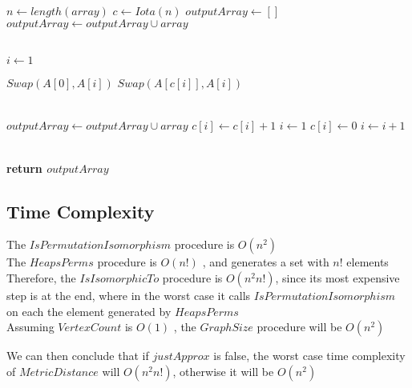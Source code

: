 \begin{algorithm}[h]
	\begin{algorithmic}[1]
		 
			\State $n \gets length(array)$
			\State $c \gets Iota(n)$ 
			\State $outputArray \gets []$
			\State $outputArray \gets outputArray \cup array$
			
			\\
			
			\State $i \gets 1$
			
						\State $Swap(A[0], A[i])$
					\Else
						\State $Swap(A[c[i]], A[i])$
					\EndIf
					
					\\
					
					\State $outputArray \gets outputArray \cup array$
					\State $c[i] \gets c[i] + 1$
					\State $i \gets 1$
				\Else
					\State $c[i] \gets 0$
					\State $i \gets i + 1$
				\EndIf
			\EndWhile
			
			\\
			
			\State \textbf{return $outputArray$}
		\EndProcedure		
	\end{algorithmic}
\end{algorithm}

\newpage

\subsection{Time Complexity}
The $IsPermutationIsomorphism$ procedure is $O(n^2)$ \\
The $HeapsPerms$ procedure is $O(n!)$ \cite{10.1093/comjnl/6.3.293}, and generates a set with $n!$ elements \\
Therefore, the $IsIsomorphicTo$ procedure is $O(n^2 n!)$, since its most expensive step is at the end, where in the worst case it calls $IsPermutationIsomorphism$ on each the element generated by $HeapsPerms$ \\
Assuming $VertexCount$ is $O(1)$ \cite{cppstandard}, the $GraphSize$ procedure will be $O(n^2)$

We can then conclude that if $justApprox$ is false, the worst case time complexity of $MetricDistance$ will $O(n^2 n!)$, otherwise it will be $O(n^2)$
